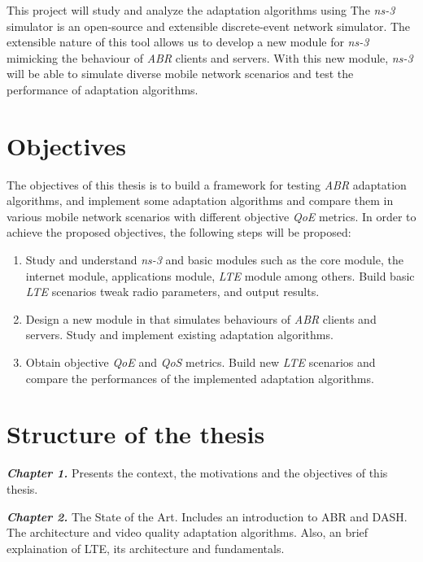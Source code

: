 This project will study and analyze the adaptation algorithms using \textit{}
The \textit{ns-3} simulator is an open-source and extensible discrete-event network simulator. 
The extensible nature of this tool allows us to develop a new module for \textit{ns-3}
mimicking the behaviour of \textit{ABR} clients and servers. With this new module, \textit{ns-3} 
will be able to simulate diverse mobile network scenarios and test the performance of adaptation algorithms.



\section{Objectives}
\label{sec:objectives}
The objectives of this thesis is to build a framework for testing \textit{ABR} adaptation
algorithms, and implement some adaptation algorithms and compare them in 
various mobile network scenarios with different objective \textit{QoE} metrics. 
In order to achieve the proposed objectives, the following steps will be proposed:

\begin{enumerate}
  \item Study and understand \textit{ns-3} and basic modules such as the core module, the
  internet module, applications module, \textit{LTE} module among others. Build basic \textit{LTE} scenarios
  tweak radio parameters, and output results.
  \item Design a new module in  that simulates behaviours of \textit{ABR} clients
  and servers. Study and implement existing adaptation algorithms.
  \item Obtain objective \textit{QoE} and \textit{QoS} metrics.
  Build new \textit{LTE} scenarios and compare the performances of the implemented adaptation
  algorithms.
\end{enumerate}


\section{Structure of the thesis}
\label{sec:structure}


\textbf{\textit{Chapter 1.}} Presents the context, the motivations and the objectives of this thesis.

\textbf{\textit{Chapter 2.}} The State of the Art. Includes an introduction to ABR and DASH. The architecture
and video quality adaptation algorithms. Also, an brief explaination of LTE, its architecture and fundamentals.

